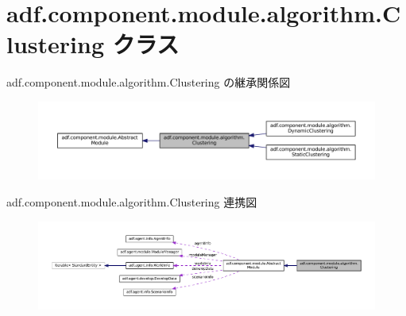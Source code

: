 \hypertarget{classadf_1_1component_1_1module_1_1algorithm_1_1Clustering}{}\section{adf.\+component.\+module.\+algorithm.\+Clustering クラス}
\label{classadf_1_1component_1_1module_1_1algorithm_1_1Clustering}


adf.\+component.\+module.\+algorithm.\+Clustering の継承関係図
\nopagebreak
\begin{figure}[H]
\begin{center}
\leavevmode
\includegraphics[width=350pt]{classadf_1_1component_1_1module_1_1algorithm_1_1Clustering__inherit__graph}
\end{center}
\end{figure}


adf.\+component.\+module.\+algorithm.\+Clustering 連携図
\nopagebreak
\begin{figure}[H]
\begin{center}
\leavevmode
\includegraphics[width=350pt]{classadf_1_1component_1_1module_1_1algorithm_1_1Clustering__coll__graph}
\end{center}
\end{figure}
